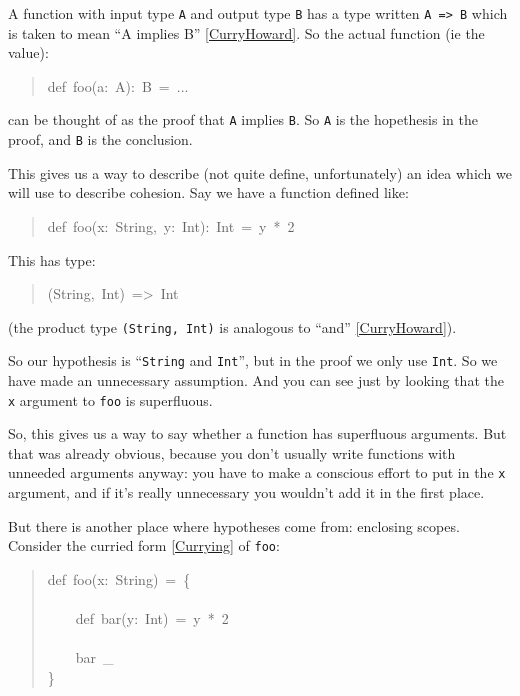 \documentclass[a4]{article}
\begin{document}
A function with input type \texttt{A} and output type \texttt{B} has a type written \texttt{A
=> B} which is taken to mean ``A implies B'' \hyperlink{curryhoward}{[CurryHoward]}. So the actual
function (ie the value):
%
\begin{quote}{\ttfamily \raggedright \noindent
def~foo(a:~A):~B~=~...
}
\end{quote}

can be thought of as the proof that \texttt{A} implies \texttt{B}. So \texttt{A} is the
hopethesis in the proof, and \texttt{B} is the conclusion.

This gives us a way to describe (not quite define, unfortunately) an idea which
we will use to describe cohesion. Say we have a function defined like:
%
\begin{quote}{\ttfamily \raggedright \noindent
def~foo(x:~String,~y:~Int):~Int~=~y~*~2
}
\end{quote}

This has type:
%
\begin{quote}{\ttfamily \raggedright \noindent
(String,~Int)~=>~Int
}
\end{quote}

(the product type \texttt{(String, Int)} is analogous to ``and'' \hyperlink{curryhoward}{[CurryHoward]}).

So our hypothesis is ``\texttt{String} and \texttt{Int}'', but in the proof we only use
\texttt{Int}. So we have made an unnecessary assumption. And you can see just by
looking that the \texttt{x} argument to \texttt{foo} is superfluous.

So, this gives us a way to say whether a function has superfluous arguments.
But that was already obvious, because you don't usually write functions with
unneeded arguments anyway: you have to make a conscious effort to put in the
\texttt{x} argument, and if it's really unnecessary you wouldn't add it in the first
place.

But there is another place where hypotheses come from: enclosing scopes.
Consider the curried form \hyperlink{currying}{[Currying]} of \texttt{foo}:
%
\begin{quote}{\ttfamily \raggedright \noindent
def~foo(x:~String)~=~\{\\
~\\
~~~~def~bar(y:~Int)~=~y~*~2\\
~\\
~~~~bar~\_\\
\}
}
\end{quote}
\end{document}
